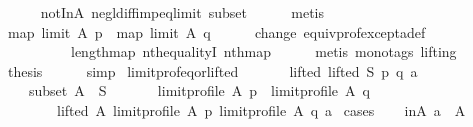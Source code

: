 \begin{isabellebody}
\ \ \ \ \isamarkupfalse%
\ notInA\ negl{\isacharunderscore}{\kern0pt}diff{\isacharunderscore}{\kern0pt}imp{\isacharunderscore}{\kern0pt}eq{\isacharunderscore}{\kern0pt}limit\ subset\isanewline
\ \ \ \ \isamarkupfalse%
\ metis\isanewline
\ \ \isamarkupfalse%
\ {\isachardoublequoteopen}map\ {\isacharparenleft}{\kern0pt}limit\ A{\isacharparenright}{\kern0pt}\ p\ {\isacharequal}{\kern0pt}\ map\ {\isacharparenleft}{\kern0pt}limit\ A{\isacharparenright}{\kern0pt}\ q{\isachardoublequoteclose}\isanewline
\ \ \ \ \isamarkupfalse%
\ change\ equiv{\isacharunderscore}{\kern0pt}prof{\isacharunderscore}{\kern0pt}except{\isacharunderscore}{\kern0pt}a{\isacharunderscore}{\kern0pt}def\isanewline
\ \ \ \ \ \ \ \ \ \ length{\isacharunderscore}{\kern0pt}map\ nth{\isacharunderscore}{\kern0pt}equalityI\ nth{\isacharunderscore}{\kern0pt}map\isanewline
\ \ \ \ \isamarkupfalse%
\ {\isacharparenleft}{\kern0pt}metis\ {\isacharparenleft}{\kern0pt}mono{\isacharunderscore}{\kern0pt}tags{\isacharcomma}{\kern0pt}\ lifting{\isacharparenright}{\kern0pt}{\isacharparenright}{\kern0pt}\isanewline
\ \ \isamarkupfalse%
\ {\isacharquery}{\kern0pt}thesis\isanewline
\ \ \ \ \isamarkupfalse%
\ simp\isanewline
{}\isamarkupfalse%
%
\endisatagproof
{\isafoldproof}%
%
\isadelimproof
\isanewline
%
\endisadelimproof
\isanewline
{}\isamarkupfalse%
\ limit{\isacharunderscore}{\kern0pt}prof{\isacharunderscore}{\kern0pt}eq{\isacharunderscore}{\kern0pt}or{\isacharunderscore}{\kern0pt}lifted{\isacharcolon}{\kern0pt}\isanewline
\ \ \isanewline
\ \ \ \ lifted{\isacharcolon}{\kern0pt}\ {\isachardoublequoteopen}lifted\ S\ p\ q\ a{\isachardoublequoteclose}\ \isanewline
\ \ \ \ subset{\isacharcolon}{\kern0pt}\ {\isachardoublequoteopen}A\ {\isasymsubseteq}\ S{\isachardoublequoteclose}\isanewline
\ \ \isanewline
\ \ \ \ {\isachardoublequoteopen}limit{\isacharunderscore}{\kern0pt}profile\ A\ p\ {\isacharequal}{\kern0pt}\ limit{\isacharunderscore}{\kern0pt}profile\ A\ q\ {\isasymor}\isanewline
\ \ \ \ \ \ \ \ lifted\ A\ {\isacharparenleft}{\kern0pt}limit{\isacharunderscore}{\kern0pt}profile\ A\ p{\isacharparenright}{\kern0pt}\ {\isacharparenleft}{\kern0pt}limit{\isacharunderscore}{\kern0pt}profile\ A\ q{\isacharparenright}{\kern0pt}\ a{\isachardoublequoteclose}\isanewline
%
\isadelimproof
%
\endisadelimproof
%
\isatagproof
{}\isamarkupfalse%
\ cases\isanewline
\ \ \isamarkupfalse%
\ inA{\isacharcolon}{\kern0pt}\ {\isachardoublequoteopen}a\ {\isasymin}\ A{\isachardoublequoteclose}\isanewline

\end{isabellebody}
